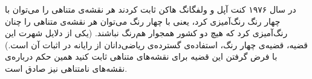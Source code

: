 در سال ۱۹۷۶ کنت آپل و ولفگانگ هاکن ثابت کردند هر نقشه‌ی متناهی را می‌توان با چهار رنگ رنگ‌آمیزی کرد، یعنی با چهار رنگ می‌توان هر نقشه‌ی متناهی را چنان رنگ‌آمیزی کرد که هیچ دو کشور همجوار هم‌رنگ نباشند. (یکی از دلایل شهرت این قضیه، قضیه‌ی چهار رنگ، استفاده‌ی گسترده‌ی ریاضی‌دانان از رایانه در اثبات آن است.) با فرض گرفتن این قضیه برای نقشه‌های متناهی ثابت کنید همین حکم درباره‌ی نقشه‌های نامتناهی نیز صادق است.